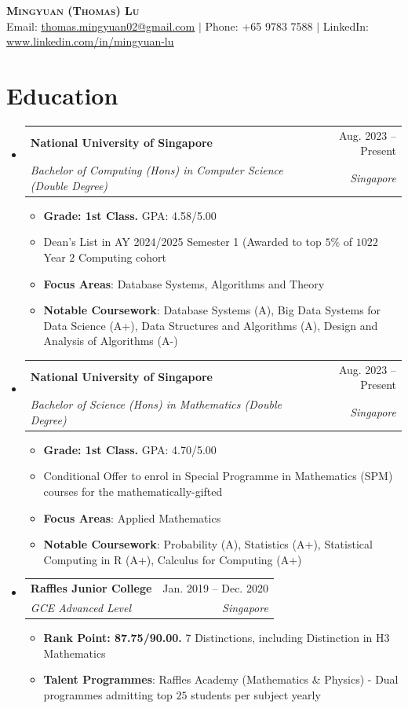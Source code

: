 \documentclass[letterpaper,7pt]{article}
\makeatletter
\newcommand{\link}[2]{\href{#1}{\color{blue}\underline{#2}}}
\newcommand{\resumeItem}[1]{\item\small{{#1 \vspace{-2pt}}}}
\newcommand{\resumeSubheading}[4]{
  \vspace{-3pt}\item
  \begin{tabular*}{0.97\textwidth}[t]{l@{\extracolsep{\fill}}r}
    \textbf{#1} & #2 \\
    \textit{\small#3} & \textit{\small #4} \\
  \end{tabular*}\vspace{-8pt}
}
\newenvironment{resumeSubHeadingList}{\begin{itemize}[leftmargin=0.15in, label={}]}{\end{itemize}}
\newenvironment{resumeItemList}{\begin{itemize}}{\end{itemize}}
\makeatother
\begin{document}
\begin{center}
  \textbf{\huge \scshape Mingyuan (Thomas) Lu} \\ \vspace{1pt}
  \small Email: \link{mailto:thomas.mingyuan02@gmail.com}{thomas.mingyuan02@gmail.com} $|$ Phone: +65 9783 7588 $|$ LinkedIn: \link{https://www.linkedin.com/in/mingyuan-lu}{www.linkedin.com/in/mingyuan-lu}
\end{center}

\section{Education}
\begin{resumeSubHeadingList}
\resumeSubheading{National University of Singapore}{Aug. 2023 -- Present}{Bachelor of Computing (Hons) in Computer Science (Double Degree)}{Singapore}
\begin{resumeItemList}
    \resumeItem{\textbf{Grade: 1st Class.} GPA: 4.58/5.00}
    \resumeItem{Dean's List in AY 2024/2025 Semester 1 (Awarded to top $5\%$ of $1022$ Year $2$ Computing cohort}
    \resumeItem{\textbf{Focus Areas}: Database Systems, Algorithms and Theory}
    \resumeItem{\textbf{Notable Coursework}: Database Systems (A), Big Data Systems for Data Science (A+), Data Structures and Algorithms (A), Design and Analysis of Algorithms (A-)}
\end{resumeItemList}
\resumeSubheading{National University of Singapore}{Aug. 2023 -- Present}{Bachelor of Science (Hons) in Mathematics (Double Degree)}{Singapore}
\begin{resumeItemList}
    \resumeItem{\textbf{Grade: 1st Class.} GPA: 4.70/5.00}
    \resumeItem{Conditional Offer to enrol in Special Programme in Mathematics (SPM) courses for the mathematically-gifted}
    \resumeItem{\textbf{Focus Areas}: Applied Mathematics}
    \resumeItem{\textbf{Notable Coursework}: Probability (A), Statistics (A+), Statistical Computing in R (A+), Calculus for Computing (A+)}
\end{resumeItemList}
\resumeSubheading{Raffles Junior College}{Jan. 2019 -- Dec. 2020}{GCE Advanced Level}{Singapore}
\begin{resumeItemList}
    \resumeItem{\textbf{Rank Point: 87.75/90.00.} 7 Distinctions, including Distinction in H3 Mathematics}
    \resumeItem{\textbf{Talent Programmes}: Raffles Academy (Mathematics \& Physics) - Dual programmes admitting top $25$ students per subject yearly}
\end{resumeItemList}
\end{resumeSubHeadingList}
\end{document}
